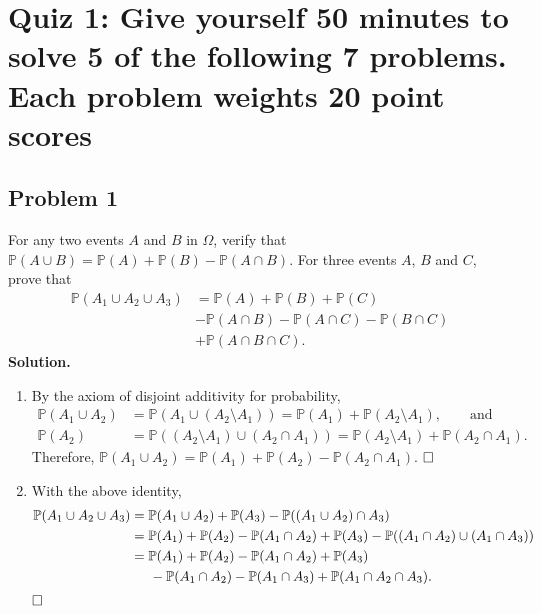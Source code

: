 \documentclass[12pt]{article}
\begin{document}
\section*{Quiz 1: Give yourself 50 minutes to solve 5 of the following 7 problems. Each problem weights 20 point scores}
\subsection*{Problem 1} For any two events $A$ and $B$ in $\Omega$, verify that $\mathbb{P}(A\cup B)=\mathbb{P}(A)+ \mathbb{P}(B)- \mathbb{P}(A\cap B)$.
For three events $A$, $B$ and $C$, prove that
\begin{equation*}
\begin{aligned}
\mathbb{P}(A_1\cup A_2\cup A_3) &= \mathbb{P}(A)+\mathbb{P}(B)+\mathbb{P}(C) \\&
-\mathbb{P}(A\cap B)-\mathbb{P}(A\cap C)-\mathbb{P}(B\cap C) \\&
+\mathbb{P}(A\cap B\cap C).
\end{aligned}
\end{equation*}
\textbf{Solution.}
\begin{enumerate}
   \item By the axiom of disjoint additivity for probability,
   \begin{equation*}
       \begin{aligned}
        \mathbb{P}(A_1\cup A_2) &=\mathbb{P}(A_1\cup(A_2\setminus A_1))=\mathbb{P}(A_1)+\mathbb{P}(A_2\setminus A_1) , \qquad \text{and}\\
        \mathbb{P}(A_2) &=\mathbb{P}((A_2\setminus A_1)\cup(A_2\cap A_1))=\mathbb{P}(A_2\setminus A_1)+\mathbb{P}(A_2\cap A_1).
       \end{aligned}
   \end{equation*}
   Therefore, $\mathbb{P}(A_1\cup A_2)=\mathbb{P}(A_1)+\mathbb{P}(A_2)-\mathbb{P}(A_2\cap A_1)$. 
    $\hspace{\fill}\square$

   \item With the above identity,
    \begin{equation*}
    \begin{aligned}
    \mathbb{P}(A_1\cup A_2\cup A_3) &= \mathbb{P}(A_1\cup A_2)+\mathbb{P}(A_3)-\mathbb{P}((A_1\cup A_2)\cap A_3) \\&
    =\mathbb{P}(A_1)+\mathbb{P}(A_2)-\mathbb{P}(A_1\cap A_2)+\mathbb{P}(A_3)-\mathbb{P}((A_1\cap A_2)\cup(A_1\cap A_3)) \\&
    =\mathbb{P}(A_1)+\mathbb{P}(A_2)-\mathbb{P}(A_1\cap A_2)+\mathbb{P}(A_3)
    \\&
    \hspace{5mm}-\mathbb{P}(A_1\cap A_2)-\mathbb{P}(A_1\cap A_3)+\mathbb{P}(A_1\cap A_2\cap A_3).
    \end{aligned}
    \end{equation*}
    $\hspace{\fill}\square$
\end{enumerate}
\end{document}
